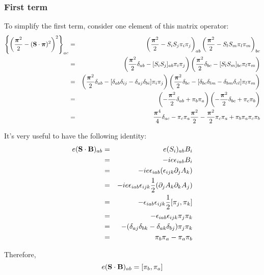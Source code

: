 \subsubsection*{First term}
To simplify the first term, consider one element of this matrix operator:
\begin{eqnarray*}
\left\{ \left(  \frac {\mbox{\boldmath$ \pi $}^2} {2} -  (\mathbf{S} \cdot \mbox{\boldmath$ \pi $})^2   \right )^2  \right \} _{ac}
	&=& 	\left (  \frac {\mbox{\boldmath$ \pi $}^2} {2} - S_i S_j \pi_i \pi_j \right)_{ab} 
				\left (  \frac {\mbox{\boldmath$ \pi $}^2} {2} - S_l S_m \pi_l \pi_m \right)_{bc}\\
	&=& 	\left (  \frac {\mbox{\boldmath$ \pi $}^2} {2}\delta_{ab} - [S_i S_j]_{ab} \pi_i \pi_j \right)
				\left (  \frac {\mbox{\boldmath$ \pi $}^2} {2}\delta_{bc} - [S_l S_m]_{bc} \pi_l \pi_m \right)\\
	&=& 	\left (  \frac {\mbox{\boldmath$ \pi $}^2} {2}\delta_{ab} - [\delta_{ab}\delta_{ij} - \delta_{aj}\delta_{bi}] \pi_i \pi_j \right)
				\left (  \frac {\mbox{\boldmath$ \pi $}^2} {2}\delta_{bc} -  [\delta_{bc}\delta_{lm} - \delta_{bm}\delta_{cl}] \pi_l \pi_m \right)\\
	&=& 	\left (  -\frac {\mbox{\boldmath$ \pi $}^2} {2}\delta_{ab} + \pi_b \pi_a \right)
				\left (  -\frac {\mbox{\boldmath$ \pi $}^2} {2}\delta_{bc} + \pi_c \pi_b \right) \\
	&=&  	\frac{ \mbox{\boldmath$ \pi $}^4 } {4} \delta_{ac}
				- \pi_c \pi_a \frac{\mbox{\boldmath$ \pi $}^2}{2}
				- \frac{\mbox{\boldmath$ \pi $}^2}{2} \pi_c \pi_a
				+ \pi_b \pi_a \pi_c \pi_b \\
\end{eqnarray*}

It's very useful to have the following identity:
\begin{eqnarray*}
	e(\mathbf{S} \cdot \mathbf{B})_{ab}
	&=&	e(S_i)_{ab} B_i	\\
	&=&	-i e \epsilon_{iab} B_i 	\\
	&=&	-i e \epsilon_{iab} (\epsilon_{ijk}\partial_j A_k)	\\
	&=&	-i e \epsilon_{iab} \epsilon_{ijk} \frac{1}{2} (\partial_j A_k \partial_k A_j) \\
	&=&	- \epsilon_{iab} \epsilon_{ijk} \frac{1}{2} [\pi_j, \pi_k]	\\
	&=&	-\epsilon_{iab} \epsilon_{ijk} \pi_j \pi_k	\\
	&=&	-(\delta_{aj} \delta_{bk}	- \delta_{ak} \delta_{bj} ) \pi_j \pi_k \\
	&=&	\pi_b \pi_a - \pi_a \pi_b	\\
\end{eqnarray*}

Therefore,
	$$ 	e(\mathbf{S} \cdot \mathbf{B})_{ab} = [\pi_b, \pi_a] $$



